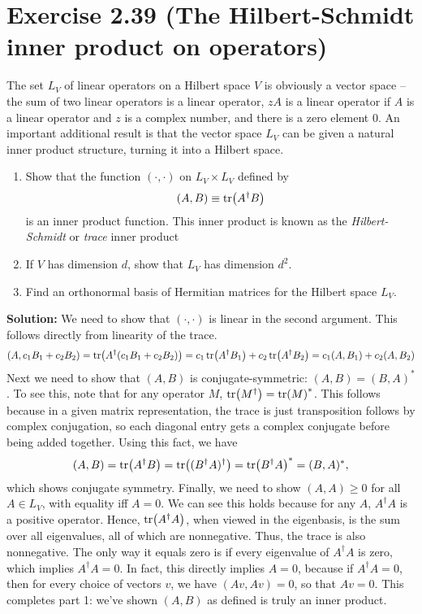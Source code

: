 \documentclass{book}
\begin{document}
\section*{Exercise 2.39 (The Hilbert-Schmidt inner product on operators)}
    The set $L_V$ of linear operators on a Hilbert space $V$ is obviously a vector space – the sum of two linear operators is a linear operator, $zA$ is a linear operator if $A$ is a linear operator and $z$ is a complex number, and there is a zero element $0$. An important additional result is that the vector space $L_V$ can be given a natural inner product structure, turning it into a Hilbert space.
    
    \begin{enumerate}
        \item Show that the function $(\cdot, \cdot)$ on $L_V \times L_V$ defined by 
        \begin{align}
            (A,B) \equiv \tr(A^\dagger B)
        \end{align}
        is an inner product function. This inner product is known as the \emph{Hilbert-Schmidt} or \emph{trace} inner product
        
        \item If $V$ has dimension $d$, show that $L_V$ has dimension $d^2$.
        
        \item Find an orthonormal basis of Hermitian matrices for the Hilbert space $L_V$.
    \end{enumerate}
    
    \textbf{Solution:} We need to show that $(\cdot, \cdot)$ is linear in the second argument. This follows directly from linearity of the trace.
    \begin{align}
        (A, c_1 B_1 + c_2 B_2) = \tr(A^\dagger (c_1 B_1 + c_2 B_2)) = c_1 \tr(A^\dagger B_1) + c_2 \tr(A^\dagger B_2) = c_1 (A,B_1) + c_2 (A, B_2)
    \end{align}
    Next we need to show that $(A,B)$ is conjugate-symmetric: $(A,B) = (B,A)^*$. To see this, note that for any operator $M$, $\tr(M^\dagger) = \tr(M)^*$. This follows because in a given matrix representation, the trace is just transposition follows by complex conjugation, so each diagonal entry gets a complex conjugate before being added together. Using this fact, we have
    \begin{align}
        (A, B) = \tr(A^\dagger B) = \tr((B^\dagger A)^\dagger) = \tr(B^\dagger A)^* = (B,A)^*,
    \end{align}
    which shows conjugate symmetry. Finally, we need to show $(A,A) \geq 0$ for all $A \in L_V$, with equality iff $A = 0$. We can see this holds because for any $A$, $A^\dagger A$ is a positive operator. Hence, $\tr(A^\dagger A)$, when viewed in the eigenbasis, is the sum over all eigenvalues, all of which are nonnegative. Thus, the trace is also nonnegative. The only way it equals zero is if every eigenvalue of $A^\dagger A$ is zero, which implies $A^\dagger A = 0$. In fact, this directly implies $A = 0$, because if $A^\dagger A = 0$, then for every choice of vectors $v$, we have $(Av, Av) = 0$, so that $Av = 0$. This completes part 1: we've shown $(A,B)$ as defined is truly an inner product.
    
\end{document}
